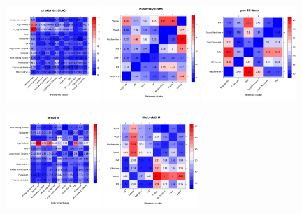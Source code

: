 \documentclass[12pt]{article}\usepackage[]{graphicx}\usepackage[]{color}
\begin{document}
\begin{appendices}
\begin{figure}[htb]
  \includegraphics[width = 0.32\textwidth]{./figure/allhmaps-22.pdf}
  \includegraphics[width = 0.32\textwidth]{./figure/allhmaps-23.pdf}
  \includegraphics[width = 0.32\textwidth]{./figure/allhmaps-24.pdf}
\end{figure}
\begin{figure}[htb]\ContinuedFloat
  \includegraphics[width = 0.32\textwidth]{./figure/allhmaps-25.pdf}
  \includegraphics[width = 0.32\textwidth]{./figure/allhmaps-26.pdf}

\end{figure}
\end{appendices}
\end{document}
